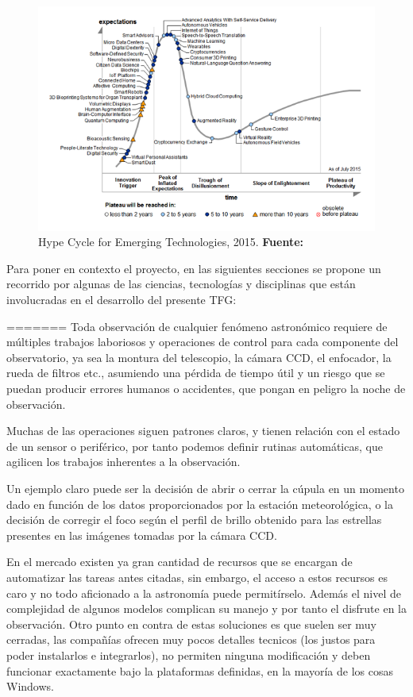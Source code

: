 \begin{figure}[h]
\includegraphics[width=1\linewidth]{../images/emergingGartner}
\caption[Hype Cycle for Emerging Technologies]{Hype Cycle for Emerging Technologies, 2015. \textbf{Fuente:}~\cite{hypeGartner}}
\label{fig:gartner}
\end{figure}


Para poner en contexto el proyecto, en las siguientes secciones se propone un recorrido por algunas de las ciencias, tecnologías y disciplinas que están involucradas en el desarrollo del presente TFG:

=======
\bigskip
Toda observación de cualquier fenómeno astronómico requiere de múltiples trabajos laboriosos y operaciones de control para cada componente del observatorio, ya sea la montura del telescopio, la cámara CCD, el enfocador, la rueda de filtros etc., asumiendo una pérdida de tiempo útil y un riesgo que se puedan producir errores humanos o accidentes, que pongan en peligro la noche de observación.

\bigskip
Muchas de las operaciones siguen patrones claros, y tienen relación con el estado de un sensor o periférico, por tanto podemos definir rutinas automáticas, 
que agilicen los trabajos inherentes a la observación. 

\bigskip
Un ejemplo claro puede ser la decisión de abrir o cerrar la cúpula en un momento dado en función de los datos proporcionados por la estación meteorológica, o la decisión de corregir el foco según el perfil de brillo obtenido para las estrellas presentes en las imágenes tomadas por la cámara CCD.

\bigskip
En el mercado existen ya gran cantidad de recursos que se encargan de automatizar las tareas antes citadas, sin embargo, el acceso a estos recursos es caro y no todo aficionado a la astronomía puede permitírselo.  Además el nivel de complejidad de algunos modelos complican su manejo y por tanto el disfrute en la observación.
Otro punto en contra de estas soluciones es que suelen ser muy cerradas, las compañías ofrecen muy pocos detalles tecnicos (los justos para poder instalarlos e integrarlos), no permiten ninguna modificación y deben funcionar exactamente bajo la plataformas definidas, en la mayoría de los cosas Windows. 

